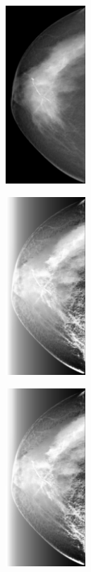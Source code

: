 \documentclass[spanish,twocolumn]{article}
\begin{document}
{\begin{minipage}[b]{1.0\linewidth}
\end{minipage}

\noindent\begin{minipage}[b]{1.0\linewidth}
  \centering
   
   \begin{minipage}[t]{0.3\linewidth}  
   		\centering
        \includegraphics[width=3cm]{Figures/entropia_local_ltg/imagen6.png}
  	\end{minipage}
  \hspace{1pt}
   \begin{minipage}[t]{0.3\linewidth}  
   		\centering
        \includegraphics[width=3cm]{Figures/entropia_local_ltg/imagen6_2_15_1.png}
  	\end{minipage}
  \hspace{1pt}
   \begin{minipage}[t]{0.3\linewidth}  
   		\centering
        \includegraphics[width=3cm]{Figures/entropia_local_ltg/imagen6_2_16_1.png}

\end{minipage}
\end{minipage}}
\end{document}
